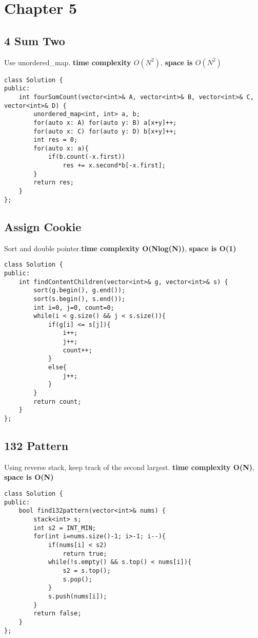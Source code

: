 \section{Chapter 5}


\subsection{4 Sum Two}
Use unordered\_map. {\color{blue}\textbf{time complexity $O(N^2)$}}, {\color{blue}\textbf{space is $O(N^2)$}}

\begin{lstlisting}
class Solution {
public:
    int fourSumCount(vector<int>& A, vector<int>& B, vector<int>& C, vector<int>& D) {
        unordered_map<int, int> a, b;
        for(auto x: A) for(auto y: B) a[x+y]++;
        for(auto x: C) for(auto y: D) b[x+y]++;
        int res = 0;
        for(auto x: a){
            if(b.count(-x.first))
                res += x.second*b[-x.first];
        }
        return res;
    }
};
\end{lstlisting}


\subsection{Assign Cookie}
Sort and double pointer.{\color{blue}\textbf{time complexity O(Nlog(N))}}, {\color{blue}\textbf{space is O(1)}}
\begin{lstlisting}
class Solution {
public:
    int findContentChildren(vector<int>& g, vector<int>& s) {
        sort(g.begin(), g.end());
        sort(s.begin(), s.end());
        int i=0, j=0, count=0;
        while(i < g.size() && j < s.size()){
            if(g[i] <= s[j]){
                i++;
                j++;
                count++;
            }
            else{
                j++;
            }
        }
        return count;
    }
};
\end{lstlisting}


\subsection{132 Pattern}
Using reverse stack, keep track of the second largest. {\color{blue}\textbf{time complexity O(N)}}, {\color{blue}\textbf{space is O(N)}}
\begin{lstlisting}
class Solution {
public:
    bool find132pattern(vector<int>& nums) {
        stack<int> s;
        int s2 = INT_MIN;
        for(int i=nums.size()-1; i>-1; i--){
            if(nums[i] < s2)
                return true;
            while(!s.empty() && s.top() < nums[i]){
                s2 = s.top();
                s.pop();
            }
            s.push(nums[i]);
        }
        return false;
    }
};
\end{lstlisting}

\subsection{}
